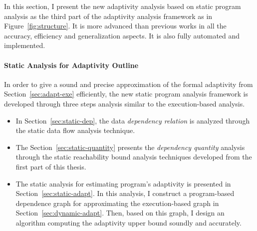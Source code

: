 In this section, I present the new 
adaptivity analysis based on static program analysis as the third part of 
the adaptivity analysis framework as in Figure~\ref{fig:structure}. 
It is more advanced than previous works in all the accuracy, efficiency and generalization aspects.
It is also fully automated and implemented.


\paragraph{{Static Analysis for Adaptivity Outline}}
%
In order to give a sound and precise approximation of the formal adaptivity from Section~\ref{sec:adapt-exe} efficiently, 
the new static program analysis framework is developed through three steps analysis
similar to the execution-based analysis.
\begin{itemize}
   \item In Section~\ref{sec:static-dep},
   the data \emph{dependency relation} is analyzed through the static data flow analysis technique.
   \item The Section~\ref{sec:static-quantity} presents the \emph{dependency quantity} analysis through
   the static reachability bound analysis techniques developed from the first part of this thesis.
   \item The static analysis for estimating program's adaptivity is presented in Section~\ref{sec:static-adapt}.
   In this analysis, I construct a program-based dependence graph for approximating the execution-based graph in Section~\ref{sec:dynamic-adapt}.
   Then, based on this graph, I design an algorithm
   computing the adaptivity upper bound soundly 
   and accurately.
   \end{itemize}